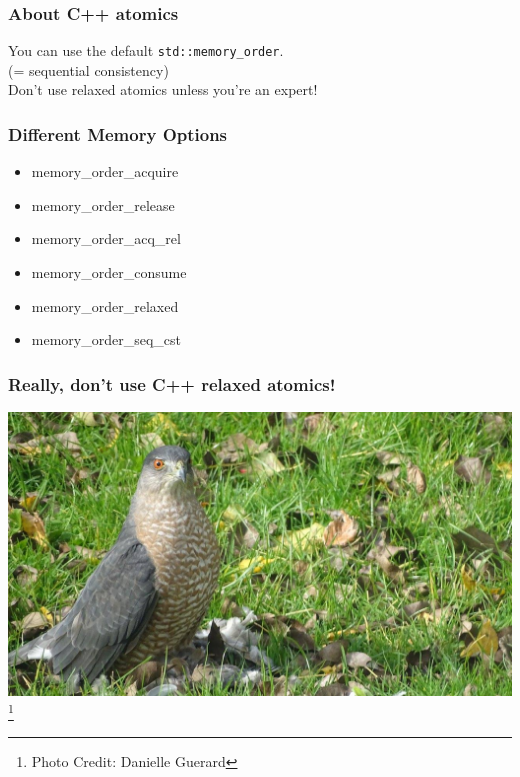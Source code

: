 \begin{frame}[fragile]
  \frametitle{About C++ atomics}
  
    You can use the default {\tt std::memory\_order}.\\
    (= sequential consistency)\\[1em]

    \alert{Don't use relaxed atomics unless you're an expert!}\\[1em]
    
\end{frame}



\begin{frame}
\frametitle{Different Memory Options}

\begin{itemize}
		\item memory\_order\_acquire
		\item memory\_order\_release
		\item memory\_order\_acq\_rel
		\item memory\_order\_consume
		\item memory\_order\_relaxed
		\item memory\_order\_seq\_cst
\end{itemize}

\end{frame}

\begin{frame}[fragile]
  \frametitle{Really, don't use C++ relaxed atomics!}
  \begin{center}
    \includegraphics[width=.8\textwidth]{images/disapproving-bird}\footnote{Photo Credit: Danielle Guerard}
  \end{center}
\end{frame}

